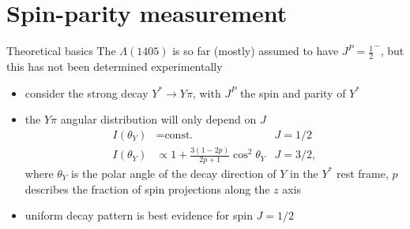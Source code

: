 \documentclass[11pt,aspectratio=1610,dvipsnames]{beamer}
\begin{document}
\section{Spin-parity measurement}
\begin{frame}{Theoretical basics}
	The $\Lambda(1405)$ is so far (mostly) assumed to have $J^P=\frac{1}{2}^-$, but this has not been determined experimentally
	\begin{tcolorbox}[colback=black!10,colframe=gray!20!black,title=Measuring spin] 
		\begin{itemize}
			\item consider the strong decay $Y^*\to Y\pi$, with $J^P$ the spin and parity of $Y^*$
			\item the $Y\pi$ angular distribution will only depend on $J$
			\begin{align*}
				I(\theta_Y)&=\text{const.} & J=1/2\\
				I(\theta_Y)&\propto 1+\frac{3(1-2p)}{2p+1}\cos^2\theta_Y& J=3/2,
			\end{align*}
			where $\theta_Y$ is the polar angle of the decay direction of $Y$ in the $Y^*$ rest frame, $p$ describes the fraction of spin projections along the $z$ axis 
			\item uniform decay pattern is best evidence for spin $J=1/2$
			
		\end{itemize}
	\end{tcolorbox}
	\begin{flushright}
	\end{flushright}
	
\end{frame}
\end{document}
